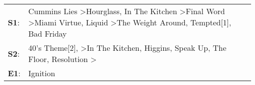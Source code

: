 \begin{supertabular}{p{0.03\textwidth}p{0.92\textwidth}}
 \textbf{S1}:  &  Cummins Lies\textsuperscript{} \textgreater \enspace Hourglass\textsuperscript{}, \enspace In The Kitchen\textsuperscript{} \textgreater \enspace Final Word\textsuperscript{} \textgreater \enspace Miami Virtue\textsuperscript{}, \enspace Liquid\textsuperscript{} \textgreater \enspace The Weight Around\textsuperscript{}, \enspace Tempted[1]\textsuperscript{}, \enspace Bad Friday\textsuperscript{}  \enspace  \\
 \textbf{S2}:  &                                                                                      40's Theme[2]\textsuperscript{}, \textsuperscript{} \textgreater \enspace In The Kitchen\textsuperscript{}, \enspace Higgins\textsuperscript{}, \enspace Speak Up\textsuperscript{}, \enspace The Floor\textsuperscript{}, \enspace Resolution\textsuperscript{} \textgreater {}\textsuperscript{}  \enspace  \\
 \textbf{E1}:  &                                                                                                                                                                                                                                                                                                                                                                                      Ignition\textsuperscript{}  \enspace  \\
\end{supertabular}
